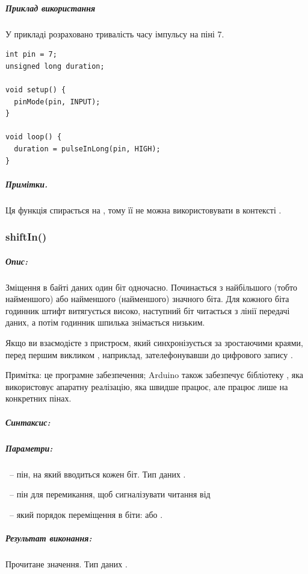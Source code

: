 \documentclass[12pt,a4paper]{report}  %
\begin{document}
\subparagraph{Приклад використання}

У прикладі розраховано тривалість часу імпульсу на піні 7.

\begin{lstlisting}[label=digitalwrite,caption=pulseInLong]
int pin = 7;
unsigned long duration;

void setup() {
  pinMode(pin, INPUT);
}

void loop() {
  duration = pulseInLong(pin, HIGH);
}
\end{lstlisting}

\subparagraph{Примітки.}

Ця функція спирається на , тому її не можна використовувати в контексті .

\subsubsection{shiftIn()}\label{shiftIn}

\subparagraph{Опис:}

Зміщення в байті даних один біт одночасно. Починається з найбільшого (тобто найменшого) або найменшого (найменшого) значного біта. Для кожного біта годинник штифт витягується високо, наступний біт читається з лінії передачі даних, а потім годинник шпилька знімається низьким.

Якщо ви взаємодієте з пристроєм, який синхронізується за зростаючими краями, перед першим викликом , наприклад, зателефонувавши до цифрового запису .

Примітка: це програмне забезпечення; Arduino також забезпечує бібліотеку , яка використовує апаратну реалізацію, яка швидше працює, але працює лише на конкретних пінах.

\subparagraph{Синтаксис:}


\subparagraph{Параметри:}

~-- пін, на який вводиться кожен біт.  Тип даних .

~-- пін для перемикання, щоб сигналізувати читання від 

~-- який порядок переміщення в біти:  або .

\subparagraph{Результат виконання:} 

Прочитане значення. Тип даних .
\end{document}
